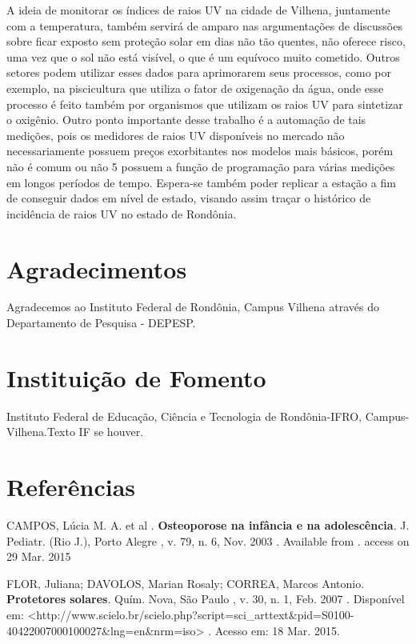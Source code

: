 \documentclass[article,12pt,onesidea,4paper,english,brazil]{abntex2}
\begin{document}
	A ideia de monitorar os índices de raios UV na cidade de Vilhena, juntamente com a temperatura, também servirá de amparo nas argumentações de discussões sobre ficar exposto sem proteção solar em dias não tão quentes, não oferece risco, uma vez que o sol não está visível, o que é um equívoco muito cometido. Outros setores podem utilizar esses dados para aprimorarem seus processos, como por exemplo, na piscicultura que utiliza o fator de oxigenação da água, onde esse processo é feito também por organismos que utilizam os raios UV para sintetizar o oxigênio.
	Outro ponto importante desse trabalho é a automação de tais medições, pois os medidores de raios UV disponíveis no mercado não necessariamente possuem preços exorbitantes nos modelos mais básicos, porém não é comum ou não
	5
	possuem a função de programação para várias medições em longos períodos de tempo. Espera-se também poder replicar a estação a fim de conseguir dados em nível de estado, visando assim traçar o histórico de incidência de raios UV no estado de Rondônia.
	
	\section*{Agradecimentos}
	Agradecemos ao Instituto Federal de Rondônia, Campus Vilhena através do Departamento de Pesquisa - DEPESP.
	
	\section*{Instituição de Fomento}
	
	Instituto Federal de Educação, Ciência e Tecnologia de Rondônia-IFRO, Campus- Vilhena.Texto IF se houver.
	
	\section*{Referências}
	
\noindent CAMPOS, Lúcia M. A. et al . \textbf{Osteoporose na infância e na adolescência}. J. Pediatr. (Rio J.), Porto Alegre , v. 79, n. 6, Nov. 2003 . Available from . access on 29 Mar. 2015

\noindent FLOR, Juliana; DAVOLOS, Marian Rosaly; CORREA, Marcos Antonio. \textbf{Protetores solares}. Quím. Nova, São Paulo , v. 30, n. 1, Feb. 2007 . Disponível em:
<http://www.scielo.br/scielo.php?script=sci\_arttext\&pid=S0100- 40422007000100027\&lng=en\&nrm=iso> . Acesso em: 18 Mar. 2015.
\end{document}
